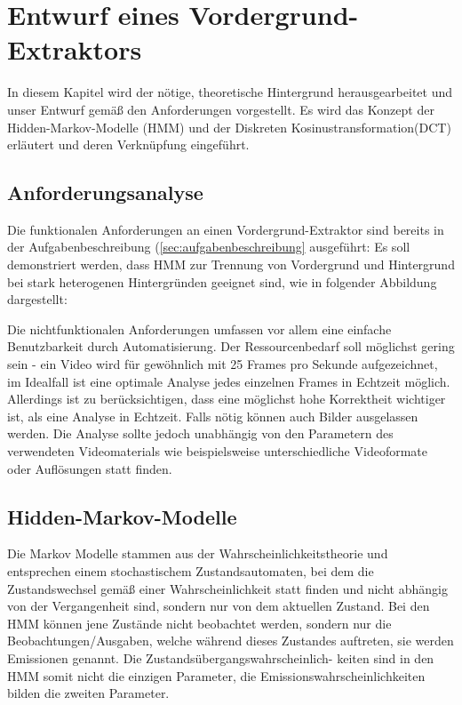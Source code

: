 \section{Entwurf eines Vordergrund-Extraktors}
\label{chap:entwurf}

In diesem Kapitel wird der nötige, theoretische Hintergrund herausgearbeitet und unser Entwurf gemäß den Anforderungen vorgestellt.
Es wird das Konzept der Hidden-Markov-Modelle (HMM) und der Diskreten Kosinustransformation(DCT) erläutert und deren Verknüpfung eingeführt.


\subsection{Anforderungsanalyse}
\label{sec:anforderungsanalyse}

Die funktionalen Anforderungen an einen Vordergrund-Extraktor sind bereits in der Aufgabenbeschreibung (\ref{sec:aufgabenbeschreibung} ausgeführt:
Es soll demonstriert werden, dass HMM zur Trennung von Vordergrund und Hintergrund bei stark heterogenen Hintergründen geeignet sind, wie in folgender Abbildung dargestellt:

Die nichtfunktionalen Anforderungen umfassen vor allem eine einfache Benutzbarkeit durch Automatisierung.
Der Ressourcenbedarf soll möglichst gering sein - ein Video wird für gewöhnlich mit 25 Frames pro Sekunde aufgezeichnet, im Idealfall ist eine optimale Analyse jedes einzelnen Frames in Echtzeit möglich.
Allerdings ist zu berücksichtigen, dass eine möglichst hohe Korrektheit wichtiger ist, als eine Analyse in Echtzeit. Falls nötig können auch Bilder ausgelassen werden.
Die Analyse sollte jedoch unabhängig von den Parametern des verwendeten Videomaterials wie beispielsweise unterschiedliche Videoformate oder Auflösungen statt finden.


\subsection{Hidden-Markov-Modelle}
\label{sec:hiddenmarkovmodel}

Die Markov Modelle stammen aus der Wahrscheinlichkeitstheorie und entsprechen einem stochastischem Zustandsautomaten, bei dem die Zustandswechsel gemäß einer Wahrscheinlichkeit statt finden und nicht abhängig von der Vergangenheit sind, sondern nur von dem aktuellen Zustand.
Bei den HMM\cite{Stamp04arevealing} können jene Zustände nicht beobachtet werden, sondern nur die Beobachtungen/Ausgaben, welche während dieses Zustandes auftreten, sie werden Emissionen genannt.
Die Zustandsübergangswahrscheinlich- keiten sind in den HMM somit nicht die einzigen Parameter, die Emissionswahrscheinlichkeiten bilden die zweiten Parameter.\\

